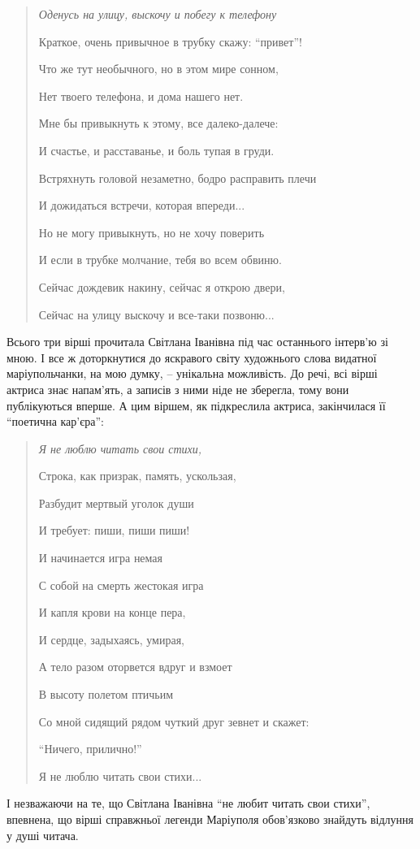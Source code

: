 \begin{quote}
\em
Оденусь на улицу, выскочу и побегу к телефону\par
Краткое, очень привычное в трубку скажу: \enquote{привет}!\par
Что же тут необычного, но в этом мире сонном,\par
Нет твоего телефона, и дома нашего нет.\par
Мне бы привыкнуть к этому, все далеко-далече:\par
И счастье, и расставанье, и боль тупая в груди.\par
Встряхнуть головой незаметно, бодро расправить плечи\par
И дожидаться встречи, которая впереди...\par
Но не могу привыкнуть, но не хочу поверить\par
И если в трубке молчание, тебя во всем обвиню.\par
Сейчас дождевик накину, сейчас я открою двери,\par
Сейчас на улицу выскочу и все-таки позвоню...\par
\end{quote}

Всього три вірші прочитала Світлана Іванівна під час останнього інтерв'ю зі
мною. І все ж доторкнутися до яскравого світу художнього слова видатної
маріупольчанки, на мою думку, –  унікальна можливість. До речі, всі вірші
актриса знає напам'ять, а записів з ними ніде не зберегла, тому вони
публікуються вперше. А цим віршем, як підкреслила актриса, закінчилася її
\enquote{поетична кар'єра}:

\begin{quote}
\em
Я не люблю читать свои стихи,\par
Строка, как призрак, память, ускользая, \par
Разбудит мертвый уголок души \par
И требует: пиши, пиши пиши! \par
И начинается игра немая \par
С собой на смерть жестокая игра\par
И капля крови на конце пера,\par
И сердце, задыхаясь, умирая,\par
А тело разом оторвется вдруг и взмоет \par
В высоту полетом птичьим\par
Со мной сидящий рядом чуткий друг зевнет и скажет:\par
\enquote{Ничего, прилично!} \par
Я не люблю читать свои стихи...\par
\end{quote}

І незважаючи на те, що Світлана Іванівна \enquote{не любит читать свои стихи},
впевнена, що вірші справжньої легенди Маріуполя обов'язково знайдуть відлуння у
душі читача. 

